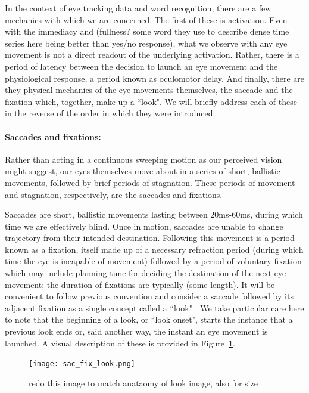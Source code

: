 In the context of eye tracking data and word recognition, there are a few mechanics with which we are concerned. The first of these is activation. Even with the immediacy and (fullness? some word they use to describe dense time series here being better than yes/no response), what we observe with any eye movement is not a direct readout of the underlying activation.  Rather, there is a period of latency between the decision to launch an eye movement and the physiological response, a period known as oculomotor delay. And finally, there are they physical mechanics of the eye movements themselves, the saccade and the fixation which, together, make up a ``look". We will briefly address each of these in the reverse of the order in which they were introduced.



\paragraph{Saccades and fixations:} Rather than acting in a continuous sweeping motion as our perceived vision might suggest, our eyes themselves move about in a series of short, ballistic movements, followed by brief periods of stagnation. These periods of movement and stagnation, respectively, are the saccades and fixations. 

Saccades are short, ballistic movements lasting between 20ms-60ms, during which time we are effectively blind. Once in motion, saccades are unable to change trajectory from their intended destination. Following this movement is a period known as a fixation, itself made up of a necessary refraction period (during which time the eye is incapable of movement) followed by a period of voluntary fixation which may include planning time for deciding the destination of the next eye movement; the duration of fixations are typically (some length). It will be convenient to follow previous convention and consider a saccade followed by its adjacent fixation as a single concept called a ``look" \cite{mcmurray2002look}. We take particular care here to note that the beginning of a look, or ``look onset", starts the instance that a previous look ends or, said another way, the instant an eye movement is launched. A visual description of these is provided in Figure~\ref{fig:sac_fix_look}.



\begin{figure}[H]
\centering
\texttt{[image: sac\_fix\_look.png]}
\caption{redo this image to match anataomy of look image, also for size}
\label{fig:sac_fix_look}
\end{figure}

